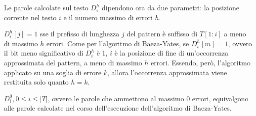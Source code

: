 Le parole calcolate sul testo $D_i^h$ dipendono ora da due parametri: la posizione corrente nel testo $i$ e il numero massimo di errori $h$.

$D_i^h[j] = 1$ sse il prefisso di lunghezza $j$ del pattern è suffisso di $T[1:i]$ a meno di massimo $h$ errori.
Come per l'algoritmo di Baeza-Yates, se $D_i^h[m] = 1$, ovvero il bit meno significativo di $D_i^h$ è 1, $i$ è la posizione di fine di un'occorrenza approssimata del pattern, a meno di massimo $h$ errori. Essendo, però, l'algoritmo applicato su una soglia di errore $k$, allora l'occorrenza approssimata viene restituita solo quanto $h = k$.

$D_i^0, 0 \le i \le |T|$, ovvero le parole che ammettono al massimo 0 errori, equivalgono alle parole calcolate nel corso dell'esecuzione dell'algoritmo di Baeza-Yates.

